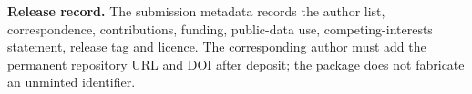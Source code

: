 \documentclass[11pt,a4paper]{article}
\numberwithin{equation}{section}
\theoremstyle{definition}\newtheorem{definition}[theorem]{Definition}
\theoremstyle{remark}\newtheorem{remark}[theorem]{Remark}
\begin{document}
\enlargethispage{4\baselineskip}
\textbf{Release record.} The submission metadata records the author list, correspondence, contributions, funding, public-data use, competing-interests statement, release tag and licence. The corresponding author must add the permanent repository URL and DOI after deposit; the package does not fabricate an unminted identifier.
\end{document}
